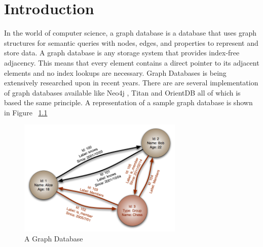\documentclass[12pt, oneside]{book}
\begin{document}
\chapter{Introduction}
In the world of computer science, a graph database is a database that uses graph structures for semantic queries with nodes, edges, and properties to represent and store data. A graph database is any storage system that provides index-free adjacency. This means that every element contains a direct pointer to its adjacent elements and no index lookups are necessary. Graph Databases is being extensively researched upon in recent years. There are are several implementation of graph databases available like Neo4j \cite{neo4j}, Titan \cite{titan} and OrientDB \cite{orientdb} all of which is based the same principle. A representation of a sample graph database is shown in Figure ~\ref{fig:sample_graph}
\begin{figure}[h]
 \begin{center}
  \includegraphics[width=0.7\textwidth]{pics/graph.png}
  \caption{A Graph Database}
 \label{fig:sample_graph}
 \end{center}
\end{figure}
\end{document}
